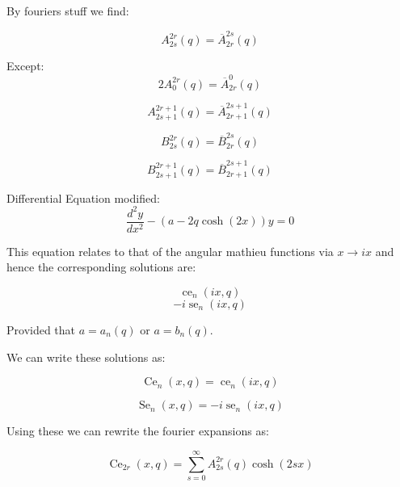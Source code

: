 \documentclass{article}
\DeclareMathOperator{\ce}{ce}
\DeclareMathOperator{\se}{se}
\DeclareMathOperator{\Ce}{Ce}
\DeclareMathOperator{\Se}{Se}
\begin{document}
By fouriers stuff we find:

\begin{equation}
    A_{2s}^{2r}(q) = \overline{A}_{2r}^{2s}(q)
\end{equation}

Except:
\begin{equation}
    2A_{0}^{2r}(q) = \overline{A}_{2r}^{0}(q)
\end{equation}

\begin{equation}
    A_{2s+1}^{2r+1}(q) = \overline{A}_{2r+1}^{2s+1}(q)
\end{equation}

\begin{equation}
    B_{2s}^{2r}(q) = \overline{B}_{2r}^{2s}(q)
\end{equation}

\begin{equation}
    B_{2s+1}^{2r+1}(q) = \overline{B}_{2r+1}^{2s+1}(q)
\end{equation}

Differential Equation modified:
\begin{equation}
    \frac{d^2y}{dx^2} - (a - 2q\cosh(2x))y = 0
\end{equation}

This equation relates to that of the angular mathieu functions via $x \rightarrow ix$ and hence the corresponding solutions are:

\begin{equation}
    \ce_n(ix, q)
\end{equation}
\begin{equation}
    -i \se_n(ix, q)
\end{equation}

Provided that $a = a_n(q)$ or $a = b_n(q)$.

We can write these solutions as:

\begin{equation}
    \Ce_n(x, q) = \ce_n(ix, q)
\end{equation}

\begin{equation}
    \Se_n(x, q) = -i \se_n(ix, q)
\end{equation}

Using these we can rewrite the fourier expansions as:

\begin{equation}
    \Ce_{2r}(x, q) = \sum_{s=0}^{\infty}{A_{2s}^{2r}(q)\cosh(2sx)}
\end{equation}
\end{document}
